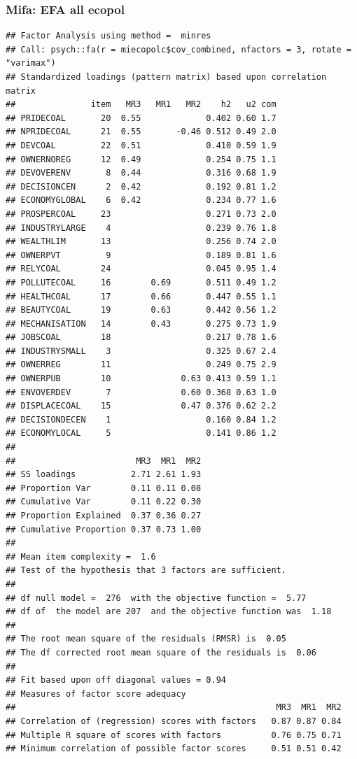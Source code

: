 \documentclass[
]{article}
\begin{document}
\hypertarget{mifa-efa-all-ecopol}{%
\subsubsection{Mifa: EFA all ecopol}\label{mifa-efa-all-ecopol}}

\begin{verbatim}
## Factor Analysis using method =  minres
## Call: psych::fa(r = miecopolc$cov_combined, nfactors = 3, rotate = "varimax")
## Standardized loadings (pattern matrix) based upon correlation matrix
##               item   MR3   MR1   MR2    h2   u2 com
## PRIDECOAL       20  0.55             0.402 0.60 1.7
## NPRIDECOAL      21  0.55       -0.46 0.512 0.49 2.0
## DEVCOAL         22  0.51             0.410 0.59 1.9
## OWNERNOREG      12  0.49             0.254 0.75 1.1
## DEVOVERENV       8  0.44             0.316 0.68 1.9
## DECISIONCEN      2  0.42             0.192 0.81 1.2
## ECONOMYGLOBAL    6  0.42             0.234 0.77 1.6
## PROSPERCOAL     23                   0.271 0.73 2.0
## INDUSTRYLARGE    4                   0.239 0.76 1.8
## WEALTHLIM       13                   0.256 0.74 2.0
## OWNERPVT         9                   0.189 0.81 1.6
## RELYCOAL        24                   0.045 0.95 1.4
## POLLUTECOAL     16        0.69       0.511 0.49 1.2
## HEALTHCOAL      17        0.66       0.447 0.55 1.1
## BEAUTYCOAL      19        0.63       0.442 0.56 1.2
## MECHANISATION   14        0.43       0.275 0.73 1.9
## JOBSCOAL        18                   0.217 0.78 1.6
## INDUSTRYSMALL    3                   0.325 0.67 2.4
## OWNERREG        11                   0.249 0.75 2.9
## OWNERPUB        10              0.63 0.413 0.59 1.1
## ENVOVERDEV       7              0.60 0.368 0.63 1.0
## DISPLACECOAL    15              0.47 0.376 0.62 2.2
## DECISIONDECEN    1                   0.160 0.84 1.2
## ECONOMYLOCAL     5                   0.141 0.86 1.2
## 
##                        MR3  MR1  MR2
## SS loadings           2.71 2.61 1.93
## Proportion Var        0.11 0.11 0.08
## Cumulative Var        0.11 0.22 0.30
## Proportion Explained  0.37 0.36 0.27
## Cumulative Proportion 0.37 0.73 1.00
## 
## Mean item complexity =  1.6
## Test of the hypothesis that 3 factors are sufficient.
## 
## df null model =  276  with the objective function =  5.77
## df of  the model are 207  and the objective function was  1.18 
## 
## The root mean square of the residuals (RMSR) is  0.05 
## The df corrected root mean square of the residuals is  0.06 
## 
## Fit based upon off diagonal values = 0.94
## Measures of factor score adequacy             
##                                                    MR3  MR1  MR2
## Correlation of (regression) scores with factors   0.87 0.87 0.84
## Multiple R square of scores with factors          0.76 0.75 0.71
## Minimum correlation of possible factor scores     0.51 0.51 0.42
\end{verbatim}
\end{document}
